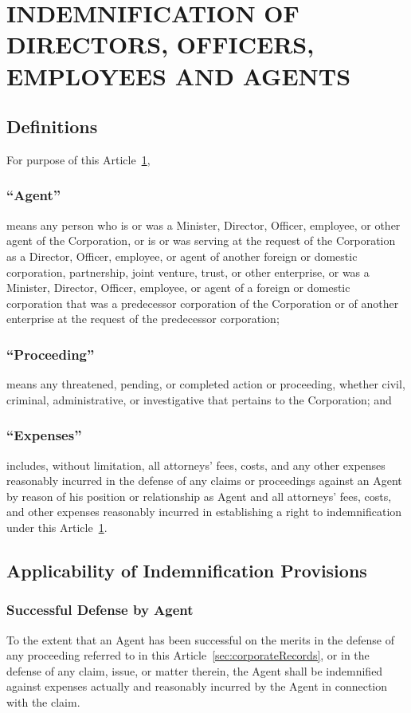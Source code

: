 \documentclass[letterpaper,titlepage]{article}
\begin{document}
\section{INDEMNIFICATION OF DIRECTORS, OFFICERS, EMPLOYEES AND AGENTS}
\label{sec:indemnificationDirectors}
\subsection{Definitions}
For purpose of this Article~\ref{sec:indemnificationDirectors},
\subsubsection{``Agent''}
\label{sec:agent}
means any person who is or was a Minister, Director, Officer, employee, or other agent of the Corporation, or is or was serving at the request of the Corporation as a Director, Officer, employee, or agent of another foreign or domestic corporation, partnership, joint venture, trust, or other enterprise, or was a Minister, Director, Officer, employee, or agent of a foreign or domestic corporation that was a predecessor corporation of the Corporation or of another enterprise at the request of the predecessor corporation;
\subsubsection{``Proceeding''}
\label{sec:proceeding}
means any threatened, pending, or completed action or proceeding, whether civil, criminal, administrative, or investigative that pertains to the Corporation; and
\subsubsection{``Expenses''}
\label{sec:expenses}
includes, without limitation, all attorneys' fees, costs, and any other
expenses reasonably incurred in the defense of any claims or proceedings
against an Agent by reason of his position or relationship as Agent and all
attorneys' fees, costs, and other expenses reasonably incurred in establishing
a right to indemnification under this Article~\ref{sec:indemnificationDirectors}.
\subsection{Applicability of Indemnification Provisions}
\label{sec:applicability}
\subsubsection{Successful Defense by Agent}
\label{sec:successfulDefense}
To the extent that an Agent has been successful on the merits in the defense of
any proceeding referred to in this Article~\ref{sec:corporateRecords}, or in the defense of any claim,
issue, or matter therein, the Agent shall be indemnified against expenses
actually and reasonably incurred by the Agent in connection with the claim.
\end{document}
